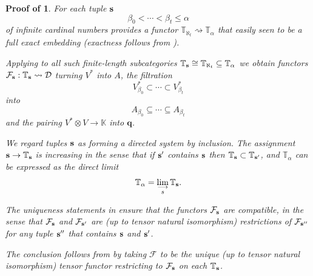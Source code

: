 \documentclass[11pt]{article}
\theoremstyle{plain}
\theoremstyle{nonumberplain}
\theoremstyle{plain}
\theoremstyle{nonumberplain}
\newtheorem{proof-of-univ-gen}{Proof of \Cref{th.univ-gen}}
\newcommand\bK{\mathbb K}
\newcommand\bT{\mathbb T}
\newcommand\cD{\mathcal D}
\begin{document}
\begin{proof-of-univ-gen}
  For each tuple ${\bf s}$
  \begin{equation*}
    \beta_0<\cdots<\beta_t\le \alpha
  \end{equation*}
  of infinite cardinal numbers  provides a functor
  $\bT_{\aleph_t}\rightsquigarrow \bT_{\alpha}$ that easily seen to be
  a full exact embedding (exactness follows from ).

  Applying  to all such finite-length subcategories
  $\bT_{\bf s}\cong \bT_{\aleph_t}\subseteq \bT_\alpha$ we obtain
  functors $\mathcal{F}_{\bf s}:\bT_{\bf s}\rightsquigarrow \cD$
  turning $V^*$ into $A$, the filtration
  \begin{equation*}
    V^*_{\beta_0}\subset \cdots\subset V^*_{\beta_t}
  \end{equation*}
into 
\begin{equation*}
  A_{\beta_0}\subseteq \cdots\subseteq A_{\beta_t}
\end{equation*}
and the pairing $V^*\otimes V\to \bK$ into $\mathbf{q}$.


We regard tuples ${\bf s}$ as forming a directed system by
inclusion. The assignment ${\bf s}\to \bT_{\bf s}$ is increasing in
the sense that if ${\bf s'}$ contains ${\bf s}$ then
$\bT_{\bf s}\subset \bT_{\bf s'}$, and $\bT_{\alpha}$ can be expressed
as the direct limit
\begin{equation}\label{eq:t-unn}
  \bT_{\alpha}=\lim_{\substack{{\longrightarrow}\\{s}}} \bT_{\bf s}. 
\end{equation}

The uniqueness statements in  ensure that the functors
$\mathcal{F}_{\bf s}$ are compatible, in the sense that
$\mathcal{F}_{\bf s}$ and $\mathcal{F}_{\bf s'}$ are (up to tensor
natural isomorphism) restrictions of $\mathcal{F}_{\bf s''}$ for any
tuple ${\bf s''}$ that contains ${\bf s}$ and ${\bf s'}$.

The conclusion follows from  by taking $\mathcal{F}$ to
be the unique (up to tensor natural isomorphism) tensor functor
restricting to $\mathcal{F}_{\bf s}$ on each $\bT_{\bf s}$.
\end{proof-of-univ-gen}







\end{document}
